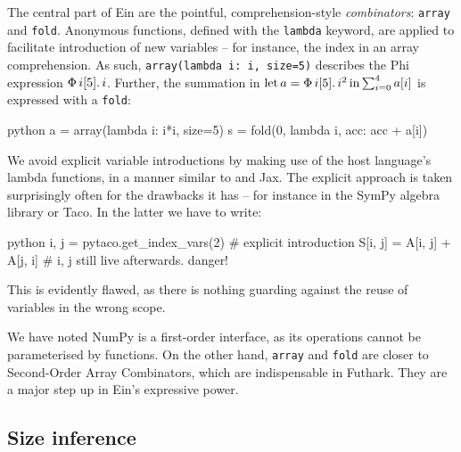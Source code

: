 The central part of Ein are the pointful, comprehension-style \textit{combinators}: \texttt{array} and \texttt{fold}. Anonymous functions, defined with the \texttt{lambda} keyword, are applied to facilitate introduction of new variables -- for instance, the index in an array comprehension. As such, \texttt{array(lambda i: i, size=5)} describes the Phi expression $\Phi\, {i}[{5}] \ldotp {i}$. Further, the summation in $\mathrm{let}\,{a}={\Phi\, {i}[{5}] \ldotp {i^2}}\,\mathrm{in}\,{ \sum_{i=0}^{4} a[i]}$ is expressed with a \texttt{fold}:
\begin{center}
\begin{cminted}{python}
a = array(lambda i: i*i, size=5)
s = fold(0, lambda i, acc: acc + a[i])
\end{cminted}
\end{center}
We avoid explicit variable introductions by making use of the host language's lambda functions, in a manner similar to \textcite{atkey2009unembedding} and Jax. The explicit approach is taken surprisingly often for the drawbacks it has -- for instance in the SymPy algebra library or Taco. In the latter we have to write:
\begin{center}
\begin{cminted}{python}
i, j = pytaco.get_index_vars(2)  # explicit introduction
S[i, j] = A[i, j] + A[j, i]      # i, j still live afterwards. danger!
\end{cminted}
\end{center}
This is evidently flawed, as there is nothing guarding against the reuse of variables in the wrong scope. 

We have noted NumPy is a first-order interface, as its operations cannot be parameterised by functions. On the other hand, \texttt{array} and \texttt{fold} are closer to Second-Order Array Combinators, which are indispensable in Futhark. They are a major step up in Ein's expressive power.



\subsection{Size inference}

